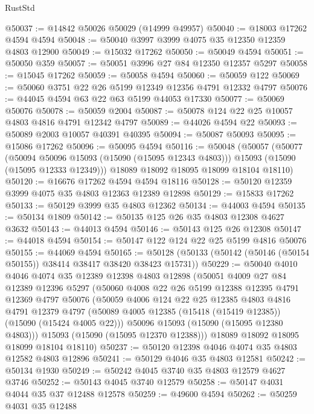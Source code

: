 \begin{lexlean}{RustStd}
\begin{coremodule}
@50037 := @14842 @50026 @50029 (@14999 @49957)
@50040 := @18003 @17262 @4594 @4594
@50048 := @50040 @3997 @3999 @4075 @35 @12350 @12359 @4803 @12900
@50049 := @15032 @17262
@50050 := @50049 @4594
@50051 := @50050 @359
@50057 := @50051 @3996 @27 @84 @12350 @12357 @5297
@50058 := @15045 @17262
@50059 := @50058 @4594
@50060 := @50059 @122
@50069 := @50060 @3751 @22 @26 @5199 @12349 @12356 @4791 @12332 @4797
@50076 := @44045 @4594 @63 @22 @63 @5199 @44053 @17330
@50077 := @50069 @50076
@50078 := @50059 @2004
@50087 := @50078 @124 @22 @25 @10057 @4803 @4816 @4791 @12342 @4797
@50089 := @44026 @4594 @22
@50093 := @50089 @2003 @10057 @40391 @40395
@50094 := @50087 @50093
@50095 := @15086 @17262
@50096 := @50095 @4594
@50116 := @50048
    (@50057
      (@50077
        (@50094 @50096 @15093 (@15090 (@15095 @12343 @4803)))
        @15093
        (@15090 (@15095 @12333 @12349)))
      @18089
      @18092
      @18095
      @18099
      @18104
      @18110)
@50120 := @16676 @17262 @4594 @4594 @18116
@50128 := @50120 @12359 @3999 @4075 @35 @4803 @12363 @12389 @12898
@50129 := @15833 @17262
@50133 := @50129 @3999 @35 @4803 @12362
@50134 := @44003 @4594
@50135 := @50134 @1809
@50142 := @50135 @125 @26 @35 @4803 @12308 @4627 @3632
@50143 := @44013 @4594
@50146 := @50143 @125 @26 @12308
@50147 := @44018 @4594
@50154 := @50147 @122 @124 @22 @25 @5199 @4816 @50076
@50155 := @44069 @4594
@50165 := @50128 (@50133 (@50142 (@50146 (@50154 @50155)) @38414 @38417 @38420 @38423 @15731))
@50229 := @50040
    @4010
    @4046
    @4074
    @35
    @12389
    @12398
    @4803
    @12898
    (@50051
      @4009
      @27
      @84
      @12389
      @12396
      @5297
      (@50060
        @4008
        @22
        @26
        @5199
        @12388
        @12395
        @4791
        @12369
        @4797
        @50076
        (@50059
          @4006
          @124
          @22
          @25
          @12385
          @4803
          @4816
          @4791
          @12379
          @4797
          (@50089 @4005 @12385 (@15418 (@15419 @12385)) (@15090 (@15424 @4005 @22)))
          @50096
          @15093
          (@15090 (@15095 @12380 @4803)))
        @15093
        (@15090 (@15095 @12370 @12388)))
      @18089
      @18092
      @18095
      @18099
      @18104
      @18110)
@50237 := @50120 @12398 @4046 @4074 @35 @4803 @12582 @4803 @12896
@50241 := @50129 @4046 @35 @4803 @12581
@50242 := @50134 @1930
@50249 := @50242 @4045 @3740 @35 @4803 @12579 @4627 @3746
@50252 := @50143 @4045 @3740 @12579
@50258 := @50147 @4031 @4044 @35 @37 @12488 @12578
@50259 := @49600 @4594
@50262 := @50259 @4031 @35 @12488

\end{coremodule}
\end{lexlean}
